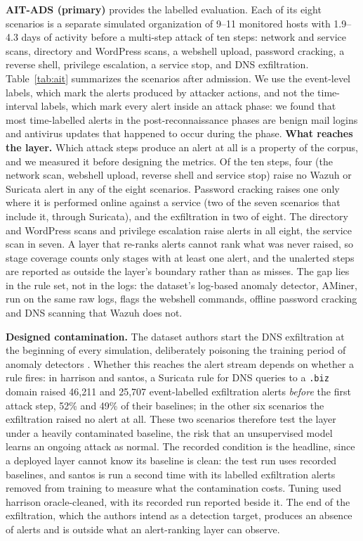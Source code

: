 \documentclass[conference]{IEEEtran}
\begin{document}
\textbf{AIT-ADS (primary)} \cite{ref21} provides the labelled evaluation. Each of its eight scenarios is a separate simulated organization of 9--11 monitored hosts with 1.9--4.3 days of activity before a multi-step attack of ten steps: network and service scans, directory and WordPress scans, a webshell upload, password cracking, a reverse shell, privilege escalation, a service stop, and DNS exfiltration. Table~\ref{tab:ait} summarizes the scenarios after admission. We use the event-level labels, which mark the alerts produced by attacker actions, and not the time-interval labels, which mark every alert inside an attack phase: we found that most time-labelled alerts in the post-reconnaissance phases are benign mail logins and antivirus updates that happened to occur during the phase. \textbf{What reaches the layer.} Which attack steps produce an alert at all is a property of the corpus, and we measured it before designing the metrics. Of the ten steps, four (the network scan, webshell upload, reverse shell and service stop) raise no Wazuh or Suricata alert in any of the eight scenarios. Password cracking raises one only where it is performed online against a service (two of the seven scenarios that include it, through Suricata), and the exfiltration in two of eight. The directory and WordPress scans and privilege escalation raise alerts in all eight, the service scan in seven. A layer that re-ranks alerts cannot rank what was never raised, so stage coverage counts only stages with at least one alert, and the unalerted steps are reported as outside the layer's boundary rather than as misses. The gap lies in the rule set, not in the logs: the dataset's log-based anomaly detector, AMiner, run on the same raw logs, flags the webshell commands, offline password cracking and DNS scanning that Wazuh does not.

\textbf{Designed contamination.} The dataset authors start the DNS exfiltration at the beginning of every simulation, deliberately poisoning the training period of anomaly detectors \cite{ref22}. Whether this reaches the alert stream depends on whether a rule fires: in harrison and santos, a Suricata rule for DNS queries to a \texttt{.biz} domain raised 46{,}211 and 25{,}707 event-labelled exfiltration alerts \emph{before} the first attack step, 52\% and 49\% of their baselines; in the other six scenarios the exfiltration raised no alert at all. These two scenarios therefore test the layer under a heavily contaminated baseline, the risk that an unsupervised model learns an ongoing attack as normal. The recorded condition is the headline, since a deployed layer cannot know its baseline is clean: the test run uses recorded baselines, and santos is run a second time with its labelled exfiltration alerts removed from training to measure what the contamination costs. Tuning used harrison oracle-cleaned, with its recorded run reported beside it. The end of the exfiltration, which the authors intend as a detection target, produces an absence of alerts and is outside what an alert-ranking layer can observe.
\end{document}
